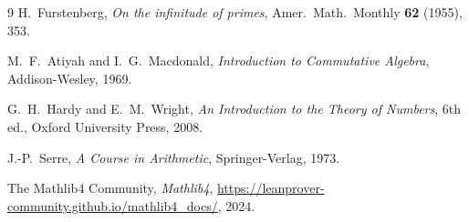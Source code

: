 \documentclass[11pt,a4paper]{amsart}
\theoremstyle{plain}
\theoremstyle{definition}
\theoremstyle{remark}
\begin{document}
\begin{thebibliography}{9}
H.~Furstenberg,
\emph{On the infinitude of primes},
Amer.\ Math.\ Monthly \textbf{62} (1955), 353.

M.~F.~Atiyah and I.~G.~Macdonald,
\emph{Introduction to Commutative Algebra},
Addison-Wesley, 1969.

G.~H.~Hardy and E.~M.~Wright,
\emph{An Introduction to the Theory of Numbers}, 6th ed.,
Oxford University Press, 2008.

J.-P.~Serre,
\emph{A Course in Arithmetic},
Springer-Verlag, 1973.

The Mathlib4 Community,
\emph{Mathlib4},
\url{https://leanprover-community.github.io/mathlib4_docs/}, 2024.
\end{thebibliography}
\end{document}
